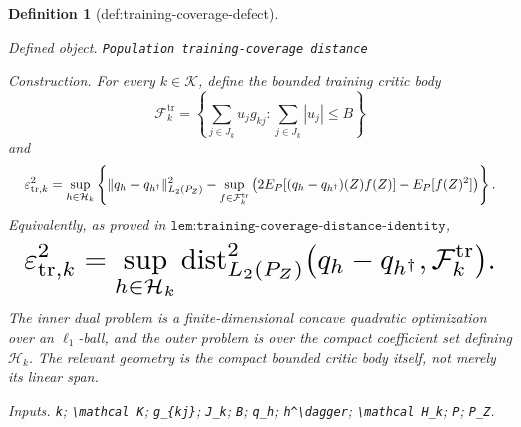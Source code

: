 \documentclass{article}
\newtheorem{definition}{Definition}
\begin{document}
\begin{definition}[def:training-coverage-defect]\label{def:training-coverage-defect}
\par\smallskip\noindent\emph{Defined object.} \texttt{Population training-\allowbreak{}coverage distance}
\par\smallskip\noindent\emph{Construction.} For every \(k\in\mathcal K\), define the bounded training critic body
\[
 \mathcal F_k^{\mathrm{tr}}
 =\left\{\sum_{j\in J_k}u_jg_{kj}:\sum_{j\in J_k}|u_j|\le B\right\}
\]
and
\[
\makebox[\linewidth][c]{\resizebox{0.98\linewidth}{!}{\(\displaystyle \varepsilon_{\mathrm{tr},k}^2
 =\sup_{h\in\mathcal H_k}
 \left\{
 \|q_h-q_{h^\dagger}\|_{L_2(P_Z)}^2
 -\sup_{f\in\mathcal F_k^{\mathrm{tr}}}
 \left(2E_P[(q_h-q_{h^\dagger})(Z)f(Z)]-E_P[f(Z)^2]\right)
 \right\}.\)}}
\]
Equivalently, as proved in \(\texttt{lem:training-coverage-distance-identity}\),
\[
\makebox[\linewidth][c]{\resizebox{0.98\linewidth}{!}{\(\displaystyle \varepsilon_{\mathrm{tr},k}^2
 =\sup_{h\in\mathcal H_k}
 \operatorname{dist}_{L_2(P_Z)}^2
 \bigl(q_h-q_{h^\dagger},\mathcal F_k^{\mathrm{tr}}\bigr).\)}}
\]
The inner dual problem is a finite-dimensional concave quadratic optimization over an \(\ell_1\)-ball, and the outer problem is over the compact coefficient set defining \(\mathcal H_k\). The relevant geometry is the compact bounded critic body itself, not merely its linear span.
\par\smallskip\noindent\emph{Inputs.} \texttt{k}; \texttt{\textbackslash{}\allowbreak{}mathcal K}; \texttt{g\_\allowbreak{}\{kj\}\allowbreak{}}; \texttt{J\_\allowbreak{}k}; \texttt{B}; \texttt{q\_\allowbreak{}h}; \texttt{h\textasciicircum{}\textbackslash{}\allowbreak{}dagger}; \texttt{\textbackslash{}\allowbreak{}mathcal H\_\allowbreak{}k}; \texttt{P}; \texttt{P\_\allowbreak{}Z}.
\end{definition}
\end{document}
